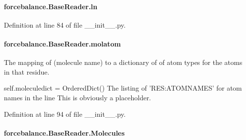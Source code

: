\hypertarget{classforcebalance_1_1BaseReader_a80c8e3bea212600742968aa8669e557b}{
\paragraph[{ln}]{\setlength{\rightskip}{0pt plus 5cm}forcebalance.\-Base\-Reader.\-ln\hspace{0.3cm}{\ttfamily [inherited]}}}\label{classforcebalance_1_1BaseReader_a80c8e3bea212600742968aa8669e557b}


Definition at line 84 of file \-\_\-\-\_\-init\-\_\-\-\_\-.\-py.

\hypertarget{classforcebalance_1_1BaseReader_ab444c213e15929253dd73395ac5f19fc}{
\paragraph[{molatom}]{\setlength{\rightskip}{0pt plus 5cm}forcebalance.\-Base\-Reader.\-molatom\hspace{0.3cm}{\ttfamily [inherited]}}}\label{classforcebalance_1_1BaseReader_ab444c213e15929253dd73395ac5f19fc}


The mapping of (molecule name) to a dictionary of of atom types for the atoms in that residue. 

self.\-moleculedict = Ordered\-Dict() The listing of 'R\-E\-S\-:A\-T\-O\-M\-N\-A\-M\-E\-S' for atom names in the line This is obviously a placeholder. 

Definition at line 94 of file \-\_\-\-\_\-init\-\_\-\-\_\-.\-py.

\hypertarget{classforcebalance_1_1BaseReader_a4369b5fb663a83b11602daa71db6862e}{
\paragraph[{Molecules}]{\setlength{\rightskip}{0pt plus 5cm}forcebalance.\-Base\-Reader.\-Molecules\hspace{0.3cm}{\ttfamily [inherited]}}}\label{classforcebalance_1_1BaseReader_a4369b5fb663a83b11602daa71db6862e}


